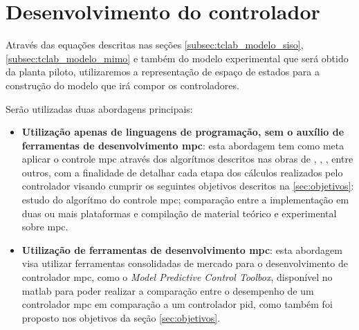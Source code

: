 \section{Desenvolvimento do controlador}
\label{sec:desenvolvimento_do_controlador}

Através das equações descritas nas seções \ref{subsec:tclab_modelo_siso}, \ref{subsec:tclab_modelo_mimo}
e também do modelo experimental que será obtido da planta piloto, utilizaremos a representação de
espaço de estados para a construção do modelo que irá compor os controladores.

Serão utilizadas duas abordagens principais:

\begin{itemize}
    \item \textbf{Utilização apenas de linguagens de programação, sem o auxílio de ferramentas de desenvolvimento
        \acrshort{mpc}}: esta abordagem tem como meta aplicar o controle \acrshort{mpc} através dos algorítmos
        descritos nas obras de , , ,
        entre outros, com a finalidade de detalhar cada etapa dos cálculos realizados pelo controlador
        visando cumprir os seguintes objetivos descritos na \ref{sec:objetivos}: estudo do algorítmo do
        controle \acrshort{mpc}; comparação entre a implementação em duas ou mais plataformas e compilação
        de material teórico e experimental sobre \acrshort{mpc}.
    \item \textbf{Utilização de ferramentas de desenvolvimento \acrshort{mpc}}: esta abordagem visa utilizar
        ferramentas consolidadas de mercado para o desenvolvimento de controlador \acrshort{mpc}, como o
        \textit{Model Predictive Control Toolbox}, disponível no \acrshort{matlab} para poder realizar
        a comparação entre o desempenho de um controlador \acrshort{mpc} em comparação a um controlador
        \acrshort{pid}, como também foi proposto nos objetivos da seção \ref{sec:objetivos}.
\end{itemize}